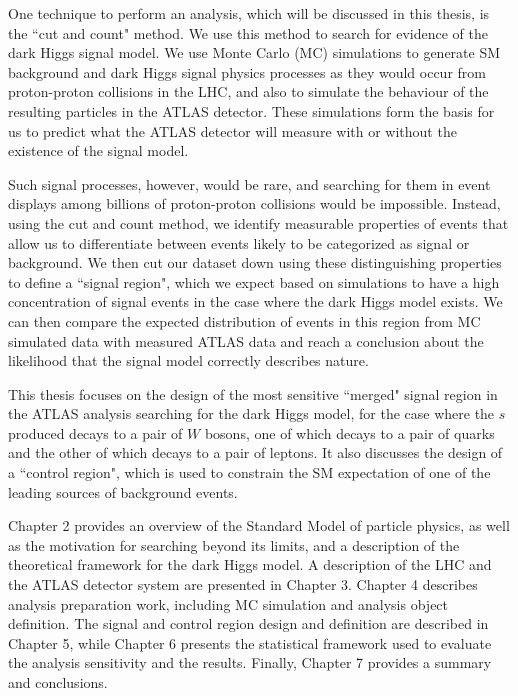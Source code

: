 One technique to perform an analysis, which will be discussed in this thesis, is the ``cut and count" method. We use this method to search for evidence of the dark Higgs signal model. We use Monte Carlo (MC) simulations to generate SM background and dark Higgs signal physics processes as they would occur from proton-proton collisions in the LHC, and also to simulate the behaviour of the resulting particles in the ATLAS detector. These simulations form the basis for us to predict what the ATLAS detector will measure with or without the existence of the signal model.

Such signal processes, however, would be rare, and searching for them in event displays among billions of proton-proton collisions would be impossible. Instead, using the cut and count method, we identify measurable properties of events that allow us to differentiate between events likely to be categorized as signal or background. We then cut our dataset down using these distinguishing properties to define a ``signal region", which we expect based on simulations to have a high concentration of signal events in the case where the dark Higgs model exists. We can then compare the expected distribution of events in this region from MC simulated data with measured ATLAS data and reach a conclusion about the likelihood that the signal model correctly describes nature.

This thesis focuses on the design of the most sensitive ``merged" signal region in the ATLAS analysis searching for the dark Higgs model, for the case where the $s$ produced decays to a pair of $W$ bosons, one of which decays to a pair of quarks and the other of which decays to a pair of leptons. It also discusses the design of a ``control region", which is used to constrain the SM expectation of one of the leading sources of background events.

Chapter 2 provides an overview of the Standard Model of particle physics, as well as the motivation for searching beyond its limits, and a description of the theoretical framework for the dark Higgs model. A description of the LHC and the ATLAS detector system are presented in Chapter 3. Chapter 4 describes analysis preparation work, including MC simulation and analysis object definition. The signal and control region design and definition are described in Chapter 5, while Chapter 6 presents the statistical framework used to evaluate the analysis sensitivity and the results. Finally, Chapter 7 provides a summary and conclusions.
